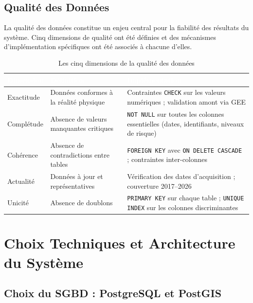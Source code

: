 \documentclass[12pt,a4paper]{report}
\begin{document}
\subsection{Qualité des Données}

La qualité des données constitue un enjeu central pour la fiabilité des résultats du système. Cinq dimensions de qualité ont été définies et des mécanismes d'implémentation spécifiques ont été associés à chacune d'elles.

\begin{table}[H]
\centering
{}
\begin{tabularx}{\textwidth}{L{2.5cm} L{4cm} X}
\toprule
{}
\textcolor{white}{\textbf{Dimension}} &
\textcolor{white}{\textbf{Définition}} &
\textcolor{white}{\textbf{Implémentation}} \\
\midrule
Exactitude   & Données conformes à la réalité physique &
  Contraintes \texttt{CHECK} sur les valeurs numériques ; validation amont via GEE \\
Complétude   & Absence de valeurs manquantes critiques &
  \texttt{NOT NULL} sur toutes les colonnes essentielles (dates, identifiants, niveaux de risque) \\
Cohérence    & Absence de contradictions entre tables &
  \texttt{FOREIGN KEY} avec \texttt{ON DELETE CASCADE} ; contraintes inter-colonnes \\
Actualité    & Données à jour et représentatives &
  Vérification des dates d'acquisition ; couverture 2017--2026 \\
Unicité      & Absence de doublons &
  \texttt{PRIMARY KEY} sur chaque table ; \texttt{UNIQUE INDEX} sur les colonnes discriminantes \\
\bottomrule
\end{tabularx}
\caption{Les cinq dimensions de la qualité des données}
\label{tab:qualite}
\end{table}

\section{Choix Techniques et Architecture du Système}

\subsection{Choix du SGBD : PostgreSQL et PostGIS}
\end{document}
